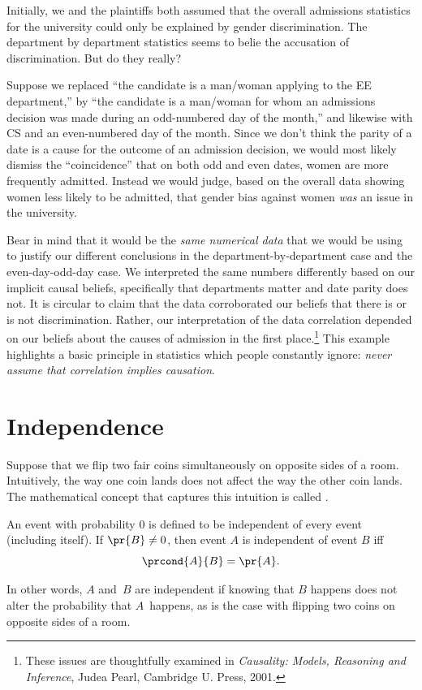Initially, we and the plaintiffs both assumed that the overall
admissions statistics for the university could only be explained by
gender discrimination.  The department by department statistics seems
to belie the accusation of discrimination.  But do they really?

Suppose we replaced ``the candidate is a man/woman applying to the EE
department,'' by ``the candidate is a man/woman for whom an admissions
decision was made during an odd-numbered day of the month,'' and
likewise with CS and an even-numbered day of the month.  Since we
don't think the parity of a date is a cause for the outcome of an
admission decision, we would most likely dismiss the ``coincidence''
that on both odd and even dates, women are more frequently admitted.
Instead we would judge, based on the overall data showing women less
likely to be admitted, that gender bias against women \emph{was} an
issue in the university.

Bear in mind that it would be the \emph{same numerical data} that we
would be using to justify our different conclusions in the
department-by-department case and the even-day-odd-day case.  We
interpreted the same numbers differently based on our implicit causal
beliefs, specifically that departments matter and date parity does
not.  It is circular to claim that the data corroborated our beliefs
that there is or is not discrimination.  Rather, our interpretation of
the data correlation depended on our beliefs about the causes of
admission in the first place.\footnote{These issues are thoughtfully
  examined in \emph{Causality: Models, Reasoning and Inference}, Judea
  Pearl, Cambridge U. Press, 2001.}  This example highlights a basic
principle in statistics which people constantly ignore: \emph{never
  assume that correlation implies causation}.
\begin{problems}
\practiceproblems
{}
\end{problems}

\section{Independence}\label{sec:independence}
Suppose that we flip two fair coins simultaneously on opposite sides
of a room.  Intuitively, the way one coin lands does not affect the
way the other coin lands.  The mathematical concept that captures
this intuition is called .
\begin{definition}\label{def:independence}
An event with probability 0 is defined to be independent of every
event (including itself).  If $\pr{B} \neq 0$, then
event $A$ is independent of event $B$ iff
\begin{equation}\label{eqn:independence}
    \prcond{A}{B} = \pr{A}.
\end{equation}
\end{definition}
In other words, $A$ and~$B$ are independent if knowing that $B$
happens does not alter the probability that $A$~happens, as is the
case with flipping two coins on opposite sides of a room.

